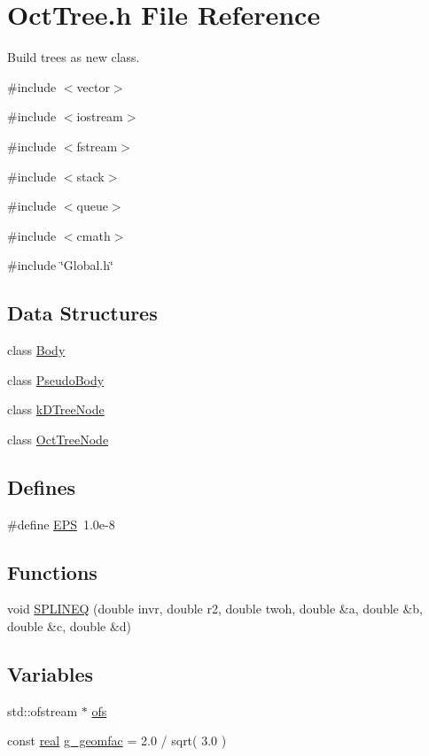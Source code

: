 \section{OctTree.h File Reference}
\label{OctTree_8h}


Build trees as new class.  


{\ttfamily \#include $<$vector$>$}\par
{\ttfamily \#include $<$iostream$>$}\par
{\ttfamily \#include $<$fstream$>$}\par
{\ttfamily \#include $<$stack$>$}\par
{\ttfamily \#include $<$queue$>$}\par
{\ttfamily \#include $<$cmath$>$}\par
{\ttfamily \#include \char`\"{}Global.h\char`\"{}}\par
\subsection*{Data Structures}
\begin{DoxyCompactItemize}
\item 
class \hyperlink{classBody}{Body}
\item 
class \hyperlink{classPseudoBody}{PseudoBody}
\item 
class \hyperlink{classkDTreeNode}{kDTreeNode}
\item 
class \hyperlink{classOctTreeNode}{OctTreeNode}
\end{DoxyCompactItemize}
\subsection*{Defines}
\begin{DoxyCompactItemize}
\item 
\#define \hyperlink{OctTree_8h_a6ebf6899d6c1c8b7b9d09be872c05aae}{EPS}~1.0e-\/8
\end{DoxyCompactItemize}
\subsection*{Functions}
\begin{DoxyCompactItemize}
\item 
void \hyperlink{OctTree_8h_aa28798c3377498cc832f71c04c1b74bd}{SPLINEQ} (double invr, double r2, double twoh, double \&a, double \&b, double \&c, double \&d)
\end{DoxyCompactItemize}
\subsection*{Variables}
\begin{DoxyCompactItemize}
\item 
std::ofstream $\ast$ \hyperlink{OctTree_8h_afdd46b61e5c98d5faed15f63c63096e6}{ofs}
\item 
const \hyperlink{Global_8h_a031f8951175b43076c2084a6c2173410}{real} \hyperlink{OctTree_8h_a2289db72f053c67352cb6864b5a12fde}{g\_\-geomfac} = 2.0 / sqrt( 3.0 )
\end{DoxyCompactItemize}


